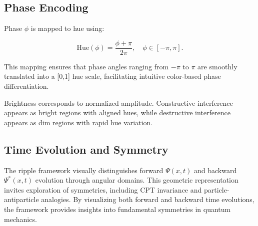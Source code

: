 \documentclass[12pt]{article}
\begin{document}
\subsection{Phase Encoding}
Phase \(\phi\) is mapped to hue using:

\[
\text{Hue}(\phi) = \frac{\phi + \pi}{2\pi}, \quad \phi \in [-\pi, \pi].
\]

This mapping ensures that phase angles ranging from \(-\pi\) to \(\pi\) are smoothly translated into a [0,1] hue scale, facilitating intuitive color-based phase differentiation.

Brightness corresponds to normalized amplitude. Constructive interference appears as bright regions with aligned hues, while destructive interference appears as dim regions with rapid hue variation.

\subsection{Time Evolution and Symmetry}
The ripple framework visually distinguishes forward \(\Psi(x,t)\) and backward \(\Psi^*(x,t)\) evolution through angular domains. This geometric representation invites exploration of symmetries, including CPT invariance and particle-antiparticle analogies. By visualizing both forward and backward time evolutions, the framework provides insights into fundamental symmetries in quantum mechanics.




 


\end{document}
